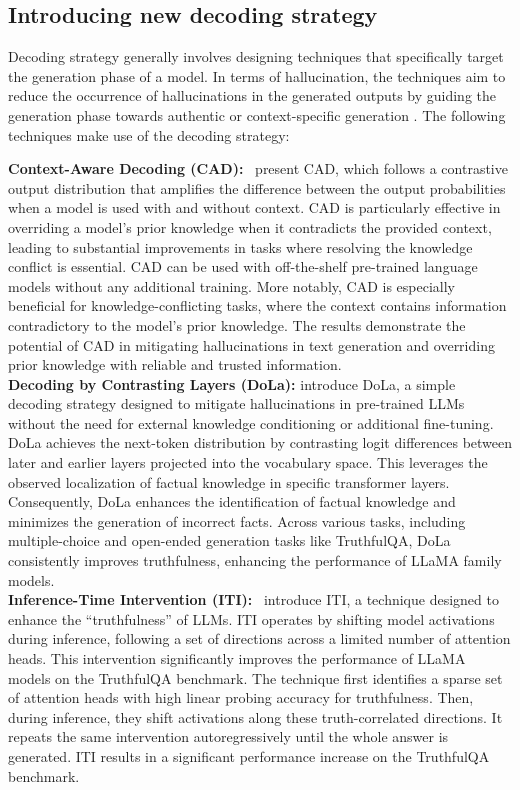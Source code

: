 \documentclass[11pt]{article}
\begin{document}
\subsection{Introducing new decoding strategy}
\label{subsubsec:Introducing new decoding strategy}
Decoding strategy generally involves designing techniques that specifically target the generation phase of a model. In terms of hallucination, the techniques aim to reduce the occurrence of hallucinations in the generated outputs by guiding the generation phase towards authentic or context-specific generation \cite{lango-dusek-2023-critic}. The following techniques make use of the decoding strategy:

\textbf{Context-Aware Decoding (CAD):}~\cite{shi2023trusting} present CAD, which follows a contrastive output distribution that amplifies the difference between the output probabilities when a model is used with and without context.
CAD is particularly effective in overriding a model’s prior
knowledge when it contradicts the provided
context, leading to substantial improvements in
tasks where resolving the knowledge conflict is
essential. CAD can be used with off-the-shelf pre-trained language models without any additional training. More notably, CAD is especially beneficial for knowledge-conflicting tasks, where the context contains information contradictory to the model’s
prior knowledge. The results demonstrate the potential of
CAD in mitigating hallucinations in text generation
and overriding prior knowledge with reliable and
trusted information. \\
\textbf{Decoding by Contrasting Layers (DoLa):} \cite{chuang2023dola} introduce DoLa, a simple decoding strategy designed to mitigate hallucinations in pre-trained LLMs without the need for external knowledge conditioning or additional fine-tuning.
DoLa achieves the next-token distribution by contrasting logit differences between later and earlier layers projected into the vocabulary space. This leverages the observed localization of factual knowledge in specific transformer layers. Consequently, DoLa enhances the identification of factual knowledge and minimizes the generation of incorrect facts. Across various tasks, including multiple-choice and open-ended generation tasks like TruthfulQA, DoLa consistently improves truthfulness, enhancing the performance of LLaMA family models. \\
\textbf{Inference-Time Intervention (ITI):}~\cite{li2023inference} introduce ITI, a technique designed to enhance the “truthfulness” of LLMs. ITI operates by shifting model
activations during inference, following a set of directions across a limited number of attention heads. This intervention significantly improves the performance of LLaMA models on the TruthfulQA benchmark. The technique first identifies a sparse set of attention heads with high linear probing accuracy for truthfulness. Then, during inference, they shift activations along these
truth-correlated directions. It repeats the same intervention autoregressively until the whole answer is generated. ITI results in a significant performance increase on the TruthfulQA benchmark.
\end{document}
